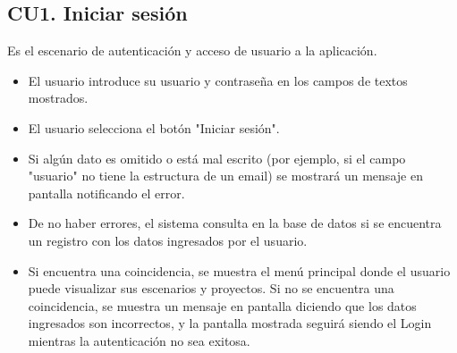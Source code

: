 \subsection{CU1. Iniciar sesión}\par
Es el escenario de autenticación y acceso de usuario a la aplicación. 
\begin{itemize}
	\item El usuario introduce su usuario y contraseña en los campos de textos mostrados.
	\item El usuario selecciona el botón "Iniciar sesión".
	\item Si algún dato es omitido o está mal escrito (por ejemplo, si el campo "usuario" no tiene la estructura de un email) se mostrará un mensaje en pantalla notificando el error.
	\item De no haber errores, el sistema consulta en la base de datos si se encuentra un registro con los datos ingresados por el usuario.
	\item Si encuentra una coincidencia, se muestra el menú principal donde el usuario puede visualizar sus escenarios y proyectos. Si no se encuentra una coincidencia, se muestra un mensaje en pantalla diciendo que los datos ingresados son incorrectos, y la pantalla mostrada seguirá siendo el Login mientras la autenticación no sea exitosa.
\end{itemize}

